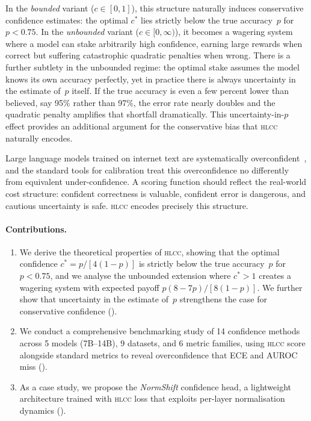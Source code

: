 \documentclass[11pt,a4paper]{article}
\newcommand{\hlcc}{\textsc{hlcc}}
\newcommand{\cstar}{c^{*}}
\begin{document}
In the \emph{bounded} variant ($c \in [0,1]$), this structure naturally
induces conservative confidence estimates: the optimal $\cstar$ lies
strictly below the true accuracy~$p$ for $p < 0.75$.  In the
\emph{unbounded} variant ($c \in [0,\infty)$), it becomes a wagering
system where a model can stake arbitrarily high confidence, earning large
rewards when correct but suffering catastrophic quadratic penalties when
wrong.  There is a further subtlety in the unbounded regime: the optimal
stake assumes the model knows its own accuracy perfectly, yet in practice
there is always uncertainty in the estimate of~$p$ itself.  If the true
accuracy is even a few percent lower than believed, say 95\% rather
than 97\%, the error rate nearly doubles and the quadratic penalty
amplifies that shortfall dramatically.  This uncertainty-in-$p$ effect
provides an additional argument for the conservative bias that \hlcc{}
naturally encodes.

Large language models trained on internet text are systematically
overconfident~\cite{guo2017calibration,hendrycks2017baseline}, and the
standard tools for calibration treat this overconfidence no differently
from equivalent under-confidence.  A scoring function should reflect
the real-world cost structure: confident correctness is
valuable, confident error is dangerous, and cautious uncertainty is
safe.  \hlcc{} encodes precisely this structure.

\paragraph{Contributions.}
\begin{enumerate}[nosep]
  \item We derive the theoretical properties of \hlcc{}, showing that
        the optimal confidence $\cstar = p/[4(1-p)]$ is strictly below
        the true accuracy~$p$ for $p < 0.75$, and we analyse the
        unbounded extension where $\cstar > 1$ creates a wagering
        system with expected payoff $p(8{-}7p)/[8(1{-}p)]$.  We further
        show that uncertainty in the estimate of~$p$ strengthens the
        case for conservative confidence ().
  \item We conduct a comprehensive benchmarking study of 14 confidence
        methods across 5 models (7B--14B), 9 datasets, and 6 metric
        families, using \hlcc{} score alongside standard metrics to
        reveal overconfidence that ECE and AUROC miss
        ().
  \item As a case study, we propose the \emph{NormShift} confidence
        head, a lightweight architecture trained with \hlcc{} loss
        that exploits per-layer normalisation dynamics
        ().
\end{enumerate}
\end{document}
